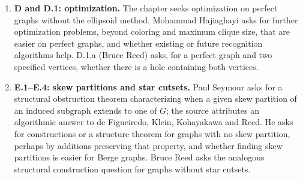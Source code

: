 \documentclass[11pt]{article}
\begin{document}
\begin{enumerate}
Jean Fonlupt and Andr\'as Seb\H{o} ask whether a uniquely colorable perfect graph has two distinct $\omega$-cliques intersecting in $\omega-1$ vertices. The two vertices in their symmetric difference are called forced. They ask whether every known uniquely colorable perfect graph collapses to an $\omega$-clique by successive identifications of forced vertices. The phrase ``every known'' does not define a quantified graph class, and the first question lacks a noncomplete-graph exception. The text also mentions, without describing the positions, that three suitably positioned forced vertices in a minimally imperfect graph imply an odd hole or antihole. Its stated further target is: every minimally imperfect graph $G$ has a vertex $v$ for which $G[N_G(v)]$ is uniquely colorable; it says a simpler proof would shortcut the proof of the Strong Perfect Graph Theorem. The omitted positions are not reconstructed.
\item \textbf{D and D.1: optimization.} The chapter seeks optimization on perfect graphs without the ellipsoid method. Mohammad Hajiaghayi asks for further optimization problems, beyond coloring and maximum clique size, that are easier on perfect graphs, and whether existing or future recognition algorithms help. D.1.a (Bruce Reed) asks, for a perfect graph and two specified vertices, whether there is a hole containing both vertices.
\item \textbf{E.1--E.4: skew partitions and star cutsets.} Paul Seymour asks for a structural obstruction theorem characterizing when a given skew partition of an induced subgraph extends to one of $G$; the source attributes an algorithmic answer to de Figueiredo, Klein, Kohayakawa and Reed. He asks for constructions or a structure theorem for graphs with no skew partition, perhaps by additions preserving that property, and whether finding skew partitions is easier for Berge graphs. Bruce Reed asks the analogous structural construction question for graphs without star cutsets.


\end{enumerate}
\end{document}

